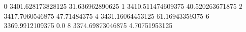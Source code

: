 0 3401.628173828125 31.636962890625
1 3410.511474609375 40.520263671875
2 3417.7060546875 47.71484375
4 3431.16064453125 61.16943359375
6 3369.9912109375 0.0
8 3374.69873046875 4.70751953125
